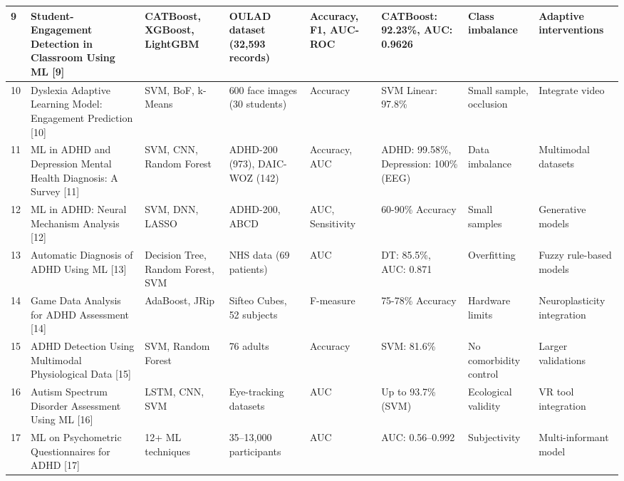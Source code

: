 \documentclass[twocolumn,12pt]{article}
\newcommand{\tablecell}[1]{\raggedright\footnotesize #1}
\begin{document}
{\begin{longtable}{|p{}|p{}|p{}|p{}|p{}|p{}|p{}|p{}|}
\hline
9 & \tablecell{Student-Engagement Detection in Classroom Using ML [9]} & \tablecell{CATBoost, XGBoost, LightGBM} & \tablecell{OULAD dataset (32,593 records)} & \tablecell{Accuracy, F1, AUC-ROC} & \tablecell{CATBoost: 92.23\%, AUC: 0.9626} & \tablecell{Class imbalance} & \tablecell{Adaptive interventions} \\
\hline
10 & \tablecell{Dyslexia Adaptive Learning Model: Engagement Prediction [10]} & \tablecell{SVM, BoF, k-Means} & \tablecell{600 face images (30 students)} & \tablecell{Accuracy} & \tablecell{SVM Linear: 97.8\%} & \tablecell{Small sample, occlusion} & \tablecell{Integrate video} \\
\hline
11 & \tablecell{ML in ADHD and Depression Mental Health Diagnosis: A Survey [11]} & \tablecell{SVM, CNN, Random Forest} & \tablecell{ADHD-200 (973), DAIC-WOZ (142)} & \tablecell{Accuracy, AUC} & \tablecell{ADHD: 99.58\%, Depression: 100\% (EEG)} & \tablecell{Data imbalance} & \tablecell{Multimodal datasets} \\
\hline
12 & \tablecell{ML in ADHD: Neural Mechanism Analysis [12]} & \tablecell{SVM, DNN, LASSO} & \tablecell{ADHD-200, ABCD} & \tablecell{AUC, Sensitivity} & \tablecell{60-90\% Accuracy} & \tablecell{Small samples} & \tablecell{Generative models} \\
\hline
13 & \tablecell{Automatic Diagnosis of ADHD Using ML [13]} & \tablecell{Decision Tree, Random Forest, SVM} & \tablecell{NHS data (69 patients)} & \tablecell{AUC} & \tablecell{DT: 85.5\%, AUC: 0.871} & \tablecell{Overfitting} & \tablecell{Fuzzy rule-based models} \\
\hline
14 & \tablecell{Game Data Analysis for ADHD Assessment [14]} & \tablecell{AdaBoost, JRip} & \tablecell{Sifteo Cubes, 52 subjects} & \tablecell{F-measure} & \tablecell{75-78\% Accuracy} & \tablecell{Hardware limits} & \tablecell{Neuroplasticity integration} \\
\hline
15 & \tablecell{ADHD Detection Using Multimodal Physiological Data [15]} & \tablecell{SVM, Random Forest} & \tablecell{76 adults} & \tablecell{Accuracy} & \tablecell{SVM: 81.6\%} & \tablecell{No comorbidity control} & \tablecell{Larger validations} \\
\hline
16 & \tablecell{Autism Spectrum Disorder Assessment Using ML [16]} & \tablecell{LSTM, CNN, SVM} & \tablecell{Eye-tracking datasets} & \tablecell{AUC} & \tablecell{Up to 93.7\% (SVM)} & \tablecell{Ecological validity} & \tablecell{VR tool integration} \\
\hline
17 & \tablecell{ML on Psychometric Questionnaires for ADHD [17]} & \tablecell{12+ ML techniques} & \tablecell{35–13,000 participants} & \tablecell{AUC} & \tablecell{AUC: 0.56–0.992} & \tablecell{Subjectivity} & \tablecell{Multi-informant model} \\

\end{longtable}}
\end{document}
